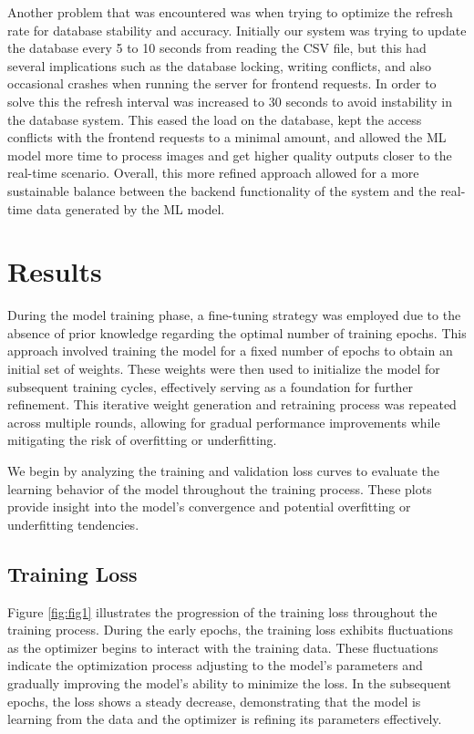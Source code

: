 \documentclass[conference]{IEEEtran}
\begin{document}
Another problem that was encountered was when trying to optimize the refresh rate for database stability and accuracy. 
Initially our system was trying to update the database every 5 to 10 seconds from reading the CSV file, 
but this had several implications such as the database locking, 
writing conflicts, 
and also occasional crashes when running the server for frontend requests. 
In order to solve this the refresh interval was increased to 30 seconds to avoid instability in the database system. 
This eased the load on the database, 
kept the access conflicts with the frontend requests to a minimal amount, 
and allowed the ML model more time to process images and get higher quality outputs closer to the real-time scenario. 
Overall, 
this more refined approach allowed for a more sustainable balance between the backend functionality of the system and the real-time data generated by the ML model.

\section{Results}

During the model training phase, 
a fine-tuning strategy was employed due to the absence of prior knowledge regarding the optimal number of training epochs. 
This approach involved training the model for a fixed number of epochs to obtain an initial set of weights. 
These weights were then used to initialize the model for subsequent training cycles, 
effectively serving as a foundation for further refinement. 
This iterative weight generation and retraining process was repeated across multiple rounds, 
allowing for gradual performance improvements while mitigating the risk of overfitting or underfitting.

We begin by analyzing the training and validation loss curves to evaluate the learning behavior of the model throughout the training process. 
These plots provide insight into the model’s convergence and potential overfitting or underfitting tendencies.

\subsection{Training Loss}

Figure \ref{fig:fig1} illustrates the progression of the training loss throughout the training process. 
During the early epochs,
the training loss exhibits fluctuations as the optimizer begins to interact with the training data. 
These fluctuations indicate the optimization process adjusting to the model’s parameters and gradually improving the model's ability to minimize the loss. 
In the subsequent epochs,
the loss shows a steady decrease, 
demonstrating that the model is learning from the data and the optimizer is refining its parameters effectively.
\end{document}
